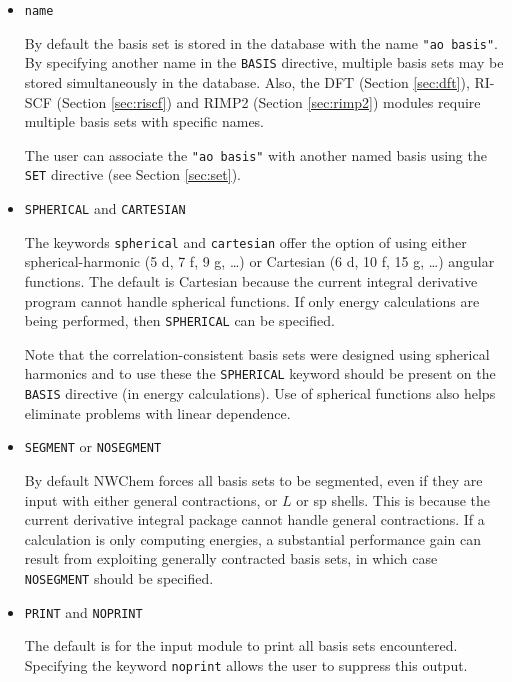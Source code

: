 \begin{itemize}
\item {\tt name}

By default the basis set is stored in the database with the name
\verb+"ao basis"+.  By specifying another name in the \verb+BASIS+
directive, multiple basis sets may be stored simultaneously in the database.
Also, the DFT (Section \ref{sec:dft}), RI-SCF (Section \ref{sec:riscf})
and RIMP2 (Section \ref{sec:rimp2}) modules require multiple basis
sets with specific names.

The user can associate the \verb+"ao basis"+ with another named basis
using the \verb+SET+ directive (see Section \ref{sec:set}).  

\item {{\tt SPHERICAL} and {\tt CARTESIAN}}

The keywords \verb+spherical+ and \verb+cartesian+ offer the option of
using either spherical-harmonic (5 d, 7 f, 9 g, \ldots) or Cartesian
(6 d, 10 f, 15 g, \ldots) angular functions.  The default is
Cartesian because the current integral derivative program cannot
handle spherical functions.  If only energy calculations are being
performed, then {\tt SPHERICAL} can be specified.  

Note that the correlation-consistent basis sets were designed using
spherical harmonics and to use these the \verb+SPHERICAL+ keyword
should be present on the \verb+BASIS+ directive (in energy
calculations).  Use of spherical functions also helps eliminate
problems with linear dependence.


\item {{\tt SEGMENT} or {\tt NOSEGMENT}}

By default NWChem forces all basis sets to be segmented, 
even if they are input with either general contractions, or $L$ or sp
shells. This is because the current derivative integral package cannot
handle general contractions.  If a calculation is only 
computing energies, a substantial
performance gain can result from exploiting generally contracted basis
sets, in which case {\tt NOSEGMENT} should be specified.

\item {{\tt PRINT} and {\tt NOPRINT}}

The default is for the input module to print all basis sets encountered.
Specifying the keyword \verb+noprint+ allows the user to suppress this output.

\end{itemize}

